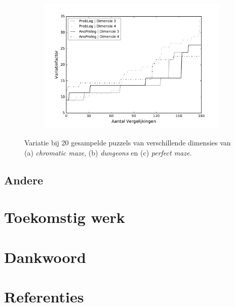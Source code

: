 \documentclass{article}
\begin{document}
\begin{figure}[t]
\begin{subfigure}{.33\textwidth}
  \caption{}
  \label{fig:sub2}
\end{subfigure}
\begin{subfigure}{.33\textwidth}
  \centering
  \includegraphics[width=\linewidth]{Grafieken/Variatie/Perfect Maze/perfectmaze.pdf}
  \caption{}
  \label{fig:sub3}
\end{subfigure}
\caption{Variatie bij 20 gesampelde puzzels van verschillende dimensies van (a) \textit{chromatic maze}, (b) \textit{dungeons} en (c) \textit{perfect maze}.}
\label{fig:test}
\end{figure}

	\subsection{Andere}

\section{Toekomstig werk}

\section*{Dankwoord}

\section{Referenties}



\end{document}
